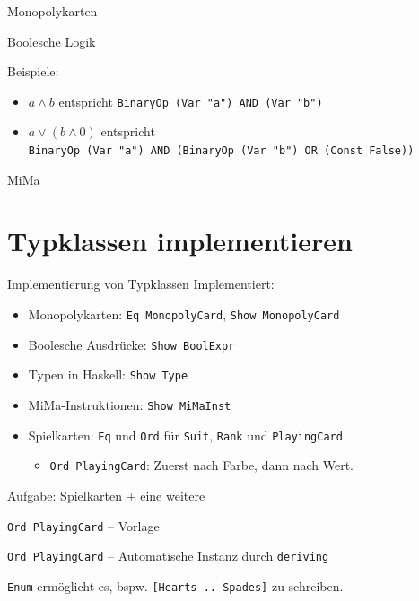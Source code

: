 \documentclass{beamer}
\begin{document}
\begin{frame}{Monopolykarten}
\end{frame}

\begin{frame}{Boolesche Logik}

  \vfill

  Beispiele:
  \begin{itemize}
    \item $a \wedge b$ entspricht \texttt{BinaryOp (Var "{}a"{}) AND (Var "{}b"{})}
    \item $a \vee (b \wedge 0)$ entspricht\\
          \texttt{BinaryOp (Var "{}a"{}) AND (BinaryOp (Var "{}b"{}) OR (Const False))}
  \end{itemize}
\end{frame}

\begin{frame}{MiMa}
\end{frame}

\section{Typklassen implementieren}

\begin{frame}{Implementierung von Typklassen}
  Implementiert:

  \vfill

  \begin{itemize}
    \item Monopolykarten: \texttt{Eq MonopolyCard}, \texttt{Show MonopolyCard}
    \item Boolesche Ausdrücke: \texttt{Show BoolExpr}
    \item Typen in Haskell: \texttt{Show Type}
    \item MiMa-Instruktionen: \texttt{Show MiMaInst}
    \item Spielkarten: \texttt{Eq} und \texttt{Ord} für \texttt{Suit}, \texttt{Rank} und \texttt{PlayingCard}
    \begin{itemize}
      \item \texttt{Ord PlayingCard}: Zuerst nach Farbe, dann nach Wert.
    \end{itemize}
  \end{itemize}

  \vfill
  
  Aufgabe: Spielkarten + eine weitere
\end{frame}

\begin{frame}{\texttt{Ord PlayingCard} -- Vorlage}
\end{frame}

\begin{frame}{\texttt{Ord PlayingCard} -- Automatische Instanz durch \texttt{deriving}}

  \texttt{Enum} ermöglicht es, bspw. \texttt{[Hearts .. Spades]} zu schreiben.
\end{frame}
\end{document}
